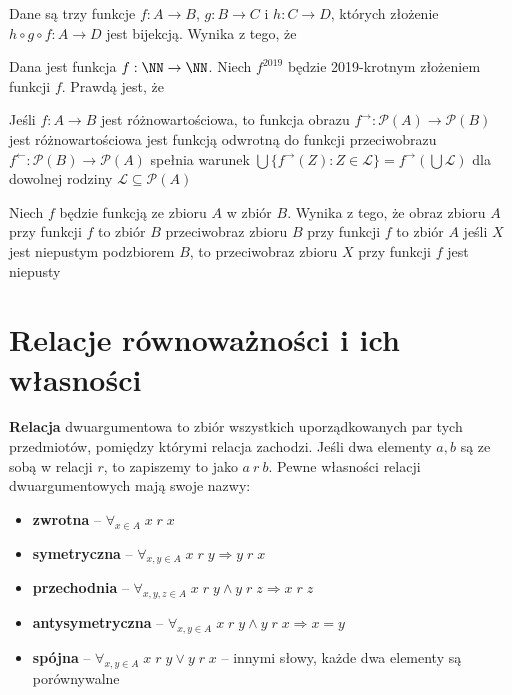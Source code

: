 \begin{problems}
    \prob Dane są trzy funkcje $f: A \rightarrow B$, $g: B \rightarrow C$ i $h: C \rightarrow D$, których złożenie $h \circ g \circ f: A \rightarrow D$ jest bijekcją. Wynika z tego, że
    
    \prob Dana jest funkcja $f: \NN \to \NN$. Niech $f^{2019}$ będzie 2019-krotnym złożeniem funkcji $f$. Prawdą jest, że
    
    \prob Jeśli $f : A \rightarrow B$ jest różnowartościowa, to funkcja obrazu $f^{\rightarrow} : \mathcal{P}(A) \rightarrow \mathcal{P}(B)$
    \answers
    {jest różnowartościowa}
    {jest funkcją odwrotną do funkcji przeciwobrazu $f^{\leftarrow} : \mathcal{P}(B) \rightarrow \mathcal{P}(A)$}
    {spełnia warunek $ \bigcup \{f^{\rightarrow}(Z): Z \in \mathcal{L}\} = f^{\rightarrow} (\bigcup \mathcal{L})$ dla dowolnej rodziny $\mathcal{L} \subseteq \mathcal{P}(A)$}

    \prob Niech $f$ będzie funkcją ze zbioru $A$ w zbiór $B$. Wynika z tego, że
    \answers
    {obraz zbioru $A$ przy funkcji $f$ to zbiór $B$}
    {przeciwobraz zbioru $B$ przy funkcji $f$ to zbiór $A$}
    {jeśli $X$ jest niepustym podzbiorem $B$, to przeciwobraz zbioru $X$ przy funkcji $f$ jest niepusty}
\end{problems}



\section{Relacje równoważności i ich własności}
\textbf{Relacja} dwuargumentowa to zbiór wszystkich uporządkowanych par tych przedmiotów, pomiędzy którymi relacja zachodzi. Jeśli dwa elementy $a, b$ są ze sobą w relacji $r$, to zapiszemy to jako $a \ r \ b$. 
Pewne własności relacji dwuargumentowych mają swoje nazwy:
\begin{itemize}
    \item \textbf{zwrotna} -- $\forall_{x \in A} \; x \; r \; x$
    \item \textbf{symetryczna} -- $\forall_{x, y \in A} \; x \; r \; y \Rightarrow y \; r \; x$
    \item \textbf{przechodnia} -- $\forall_{x, y, z \in A} \; x \; r \; y \land y \; r \; z \Rightarrow x \; r \; z$
    \item \textbf{antysymetryczna} -- $\forall_{x, y \in A} \; x \; r \; y \land y \; r \; x \Rightarrow x = y$
    \item \textbf{spójna} -- $\forall_{x, y \in A} \; x \; r \; y \lor y \; r \; x$ -- innymi słowy, każde dwa elementy są porównywalne
\end{itemize}


